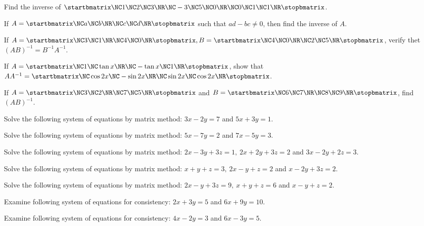 \item Find the inverse of $\startbmatrix\NC 1 \NC 2 \NC 3 \NR\NC -3 \NC 5 \NC 0 \NR\NC 0 \NC 1 \NC 1\NR\stopbmatrix $.
\item If $A = \startbmatrix\NC a \NC b \NR\NC c \NC d\NR\stopbmatrix $ such that $ad - bc \neq 0$, then find the inverse of $A$.
\item If $A = \startbmatrix\NC 3 \NC 1 \NR\NC 4 \NC 0\NR\stopbmatrix , B = \startbmatrix\NC  4 \NC 0 \NR\NC 2 \NC 5 \NR\stopbmatrix $, verify thet $(AB)^{-1}
  = B^{-1}A^{-1}$.
\item If $A = \startbmatrix\NC 1 \NC \tan x \NR\NC -\tan x \NC 1\NR\stopbmatrix $, show that $AA^{-1} = \startbmatrix\NC \cos 2x \NC -\sin 2x
    \NR\NC \sin 2x \NC \cos 2x\NR\stopbmatrix $.
\item If $A = \startbmatrix\NC  3 \NC 2 \NR\NC 7 \NC 5 \NR\stopbmatrix $ and $B = \startbmatrix\NC  6 \NC 7 \NR\NC 8 \NC 9 \NR\stopbmatrix $, find $(AB)^{-1}$.
\item Solve the following system of equations by matrix method: $3x - 2y = 7$ and $5x + 3y = 1$.
\item Solve the following system of equations by matrix method: $5x - 7y = 2$ and $7x -5y = 3$.
\item Solve the following system of equations by matrix method: $2x - 3y + 3z = 1,\ 2x + 2y + 3z = 2$ and $3x -2y + 2z = 3$.
\item Solve the following system of equations by matrix method: $x + y + z = 3,\ 2x - y + z = 2$ and $x - 2y + 3z = 2$.
\item Solve the following system of equations by matrix method: $2x - y + 3z = 9,\ x + y + z = 6$ and $x - y + z = 2$.
\item Examine following system of equations for consistency: $2x + 3y = 5$ and $6x + 9y = 10$.
\item Examine following system of equations for consistency: $4x - 2y = 3$ and $6x - 3y = 5$.
\stopitemize
